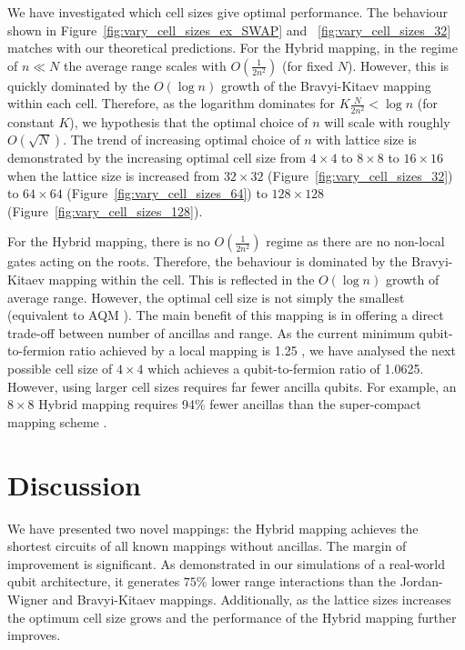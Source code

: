 \documentclass[pdftex,pra,aps,twocolumn,twoside]{revtex4-2}
\theoremstyle{plain}
\theoremstyle{note}
\newcommand\+{{\footnotesize \raisebox{0.3ex}{+}}}
\begin{document}
We have investigated which cell sizes give optimal performance. The behaviour shown in Figure~\ref{fig:vary_cell_sizes_ex_SWAP} and ~\ref{fig:vary_cell_sizes_32} matches with our theoretical predictions. For the Hybrid mapping, in the regime of $n \ll N$ the average range scales with $O(\frac{1}{2n^2})$ (for fixed $N$). However, this is quickly dominated by the $O(\log n)$ growth of the Bravyi-Kitaev mapping within each cell. Therefore, as the logarithm dominates for $K\frac{N}{2n^2} < \log n$ (for constant $K$), we hypothesis that the optimal choice of $n$ will scale with roughly $O(\sqrt{N})$. The trend of increasing optimal choice of $n$ with lattice size is demonstrated by the increasing optimal cell size from $4\times 4$ to $8\times 8$ to $16 \times 16$ when the lattice size is increased from $32 \times 32$ (Figure~\ref{fig:vary_cell_sizes_32}) to $64 \times 64$ (Figure~\ref{fig:vary_cell_sizes_64}) to $128 \times 128$ (Figure~\ref{fig:vary_cell_sizes_128}).

For the Hybrid\+ mapping, there is no $O(\frac{1}{2n^2})$ regime as there are no non-local gates acting on the roots. Therefore, the behaviour is dominated by the Bravyi-Kitaev mapping within the cell. This is reflected in the $O(\log n)$ growth of average range. However, the optimal cell size is not simply the smallest (equivalent to AQM \cite{steudtner2019quantum}). The main benefit of this mapping is in offering a direct trade-off between number of ancillas and range. As the current minimum qubit-to-fermion ratio achieved by a local mapping is 1.25 \cite{chen2022equivalence}, we have analysed the next possible cell size of $4 \times 4$ which achieves a qubit-to-fermion ratio of 1.0625. However, using larger cell sizes requires far fewer ancilla qubits. For example, an $8 \times 8$ Hybrid\+ mapping requires 94\% fewer ancillas than the super-compact mapping scheme \cite{chen2022equivalence}.

\section{Discussion}
We have presented two novel mappings: the Hybrid mapping achieves the shortest circuits of all known mappings without ancillas. The margin of improvement is significant. As demonstrated in our simulations of a real-world qubit architecture, it generates $75\%$ lower range interactions than the Jordan-Wigner and Bravyi-Kitaev mappings. Additionally, as the lattice sizes increases the optimum cell size grows and the performance of the Hybrid mapping further improves.
\end{document}
